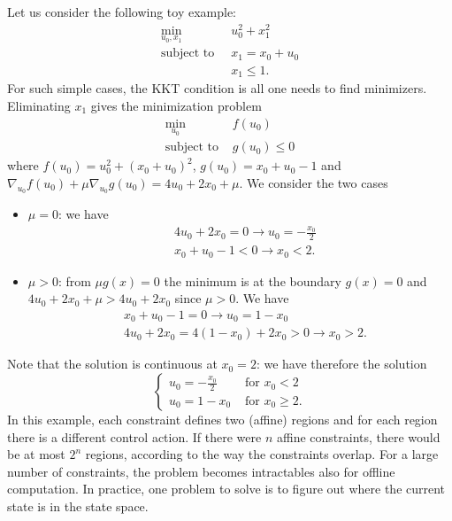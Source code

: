 \documentclass[11pt]{report}
\begin{document}
Let us consider the following toy example:
\begin{align*}
  \min_{u_0,x_1} &\ u_0^2+x_1^2 \\
  \text{subject to } &\ x_1 = x_0+u_0 \\
                 &\ x_1\le 1.
\end{align*}
For such simple cases, the KKT condition is all one needs to find minimizers. Eliminating $x_1$ gives the minimization problem
\begin{align*}
  \min_{u_0}\  & f(u_0) \\
  \text{subject to } & g(u_0) \le 0
\end{align*}
where $f(u_0) = u_0^2 + (x_0+u_0)^2$, $g(u_0) = x_0 + u_0 - 1$ and $\nabla_{u_0} f(u_0) + \mu \nabla_{u_0} g(u_0) = 4u_0 + 2x_0 + \mu$. We consider the two cases
\begin{itemize}
\item $\mu = 0$: we have
  \begin{align*}
    & 4u_0 + 2x_0 = 0 \rightarrow u_0 = -\frac{x_0}{2} \\
    & x_0 + u_0 - 1 < 0 \rightarrow x_0 < 2.
  \end{align*}
\item $\mu > 0$: from $\mu g(x) = 0$ the minimum is at the boundary $g(x)=0$ and $4u_0+2x_0+\mu > 4u_0+2x_0$ since $\mu>0$. We have
  \begin{align*}
    &x_0 + u_0 - 1 = 0 \rightarrow u_0 = 1-x_0 \\
    &4u_0 + 2x_0 = 4(1-x_0) + 2x_0 > 0 \rightarrow x_0 > 2.
  \end{align*}
\end{itemize}
Note that the solution is continuous at $x_0=2$: we have therefore the solution
\begin{equation*}
  \begin{cases}
    u_0 = -\frac{x_0}{2} & \text{ for } x_0 < 2 \\
    u_0 = 1-x_0 & \text{ for } x_0 \ge 2.
  \end{cases}
\end{equation*}
In this example, each constraint defines two (affine) regions and for each region there is a different control action. If there were $n$ affine constraints, there would be at most $2^n$ regions, according to the way the constraints overlap. For a large number of constraints, the problem becomes intractables also for offline computation. In practice, one problem to solve is to figure out where the current state is in the state space.
\end{document}
